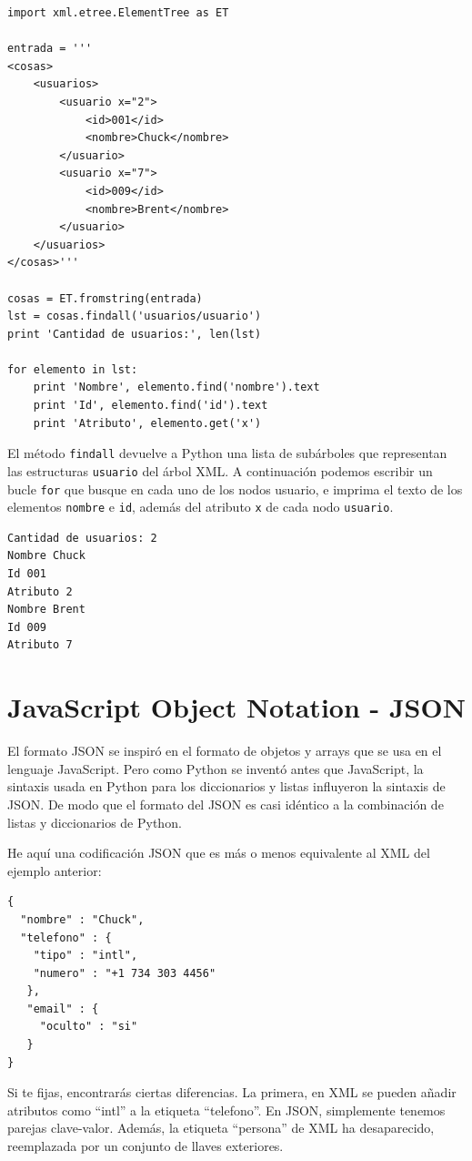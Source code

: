 \beforeverb
\begin{verbatim}
import xml.etree.ElementTree as ET

entrada = '''
<cosas>
    <usuarios>
        <usuario x="2">
            <id>001</id>
            <nombre>Chuck</nombre>
        </usuario>
        <usuario x="7">
            <id>009</id>
            <nombre>Brent</nombre>
        </usuario>
    </usuarios>
</cosas>'''

cosas = ET.fromstring(entrada)
lst = cosas.findall('usuarios/usuario')
print 'Cantidad de usuarios:', len(lst)

for elemento in lst:
    print 'Nombre', elemento.find('nombre').text
    print 'Id', elemento.find('id').text
    print 'Atributo', elemento.get('x')
\end{verbatim}
\afterverb
%
El método {\tt findall} devuelve a Python una lista de subárboles que
representan las estructuras {\tt usuario} del árbol XML. A continuación podemos
escribir un bucle {\tt for} que busque en cada uno de los nodos usuario,
e imprima el texto de los elementos {\tt nombre} e {\tt id}, además del
atributo {\tt x} de cada nodo {\tt usuario}.

\beforeverb
\begin{verbatim}
Cantidad de usuarios: 2
Nombre Chuck
Id 001
Atributo 2
Nombre Brent
Id 009
Atributo 7
\end{verbatim}
\afterverb
%

\section{JavaScript Object Notation - JSON}

El formato JSON se inspiró en el formato de objetos y arrays que se usa en el lenguaje
JavaScript. Pero como Python se inventó antes que JavaScript, la sintaxis usada en Python
para los diccionarios y listas influyeron la sintaxis de JSON. De modo que el formato
del JSON es casi idéntico a la combinación de listas y diccionarios de Python.

He aquí una codificación JSON que es más o menos equivalente al XML del ejemplo anterior:

\beforeverb
\begin{verbatim}
{
  "nombre" : "Chuck",
  "telefono" : {
    "tipo" : "intl",
    "numero" : "+1 734 303 4456"
   },
   "email" : {
     "oculto" : "si"
   }
}
\end{verbatim}
\afterverb
%
Si te fijas, encontrarás ciertas diferencias. La primera, en XML se pueden añadir atributos como
``intl'' a la etiqueta ``telefono''. En JSON, simplemente tenemos parejas clave-valor.
Además, la etiqueta ``persona'' de XML ha desaparecido, reemplazada por un conjunto
de llaves exteriores.

